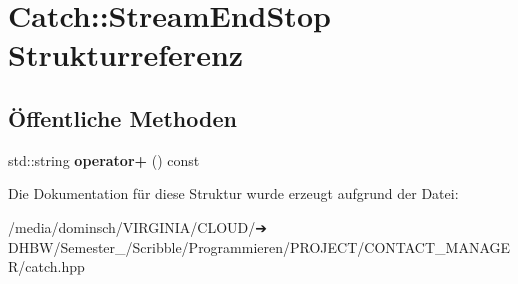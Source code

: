 \hypertarget{structCatch_1_1StreamEndStop}{}\section{Catch\+:\+:Stream\+End\+Stop Strukturreferenz}
\label{structCatch_1_1StreamEndStop}
\subsection*{Öffentliche Methoden}
\begin{DoxyCompactItemize}
\item 
\mbox{\label{structCatch_1_1StreamEndStop_a4a518f0342a381074821d5bda2651401}} 
std\+::string {\bfseries operator+} () const
\end{DoxyCompactItemize}


Die Dokumentation für diese Struktur wurde erzeugt aufgrund der Datei\+:\begin{DoxyCompactItemize}
\item 
/media/dominsch/\+V\+I\+R\+G\+I\+N\+I\+A/\+C\+L\+O\+U\+D/➔ D\+H\+B\+W/\+Semester\+\_/\+Scribble/\+Programmieren/\+P\+R\+O\+J\+E\+C\+T/\+C\+O\+N\+T\+A\+C\+T\+\_\+\+M\+A\+N\+A\+G\+E\+R/catch.\+hpp\end{DoxyCompactItemize}
